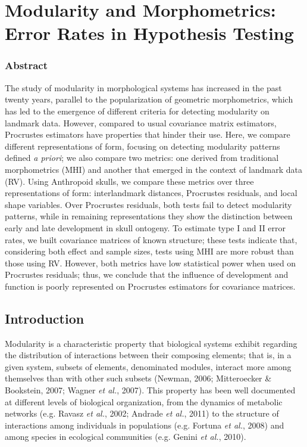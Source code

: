 \documentclass[12pt,twoside]{report}
\begin{document}


\def\sectionautorefname{Section} \def\chapterautorefname{Chapter}
\def\figureautorefname{Figure} \def\tableautorefname{Table}


\newpage
\chapter{Modularity and Morphometrics: Error Rates in Hypothesis Testing}
\label{ch:modcomp}

\subsection{Abstract}\label{abstract}

The study of modularity in morphological systems has increased in the
past twenty years, parallel to the popularization of geometric
morphometrics, which has led to the emergence of different criteria for
detecting modularity on landmark data. However, compared to usual
covariance matrix estimators, Procrustes estimators have properties that
hinder their use. Here, we compare different representations of form,
focusing on detecting modularity patterns defined \emph{a priori}; we
also compare two metrics: one derived from traditional morphometrics
(MHI) and another that emerged in the context of landmark data (RV).
Using Anthropoid skulls, we compare these metrics over three
representations of form: interlandmark distances, Procrustes residuals,
and local shape variables. Over Procrustes residuals, both tests fail to
detect modularity patterns, while in remaining representations they show
the distinction between early and late development in skull ontogeny. To
estimate type I and II error rates, we built covariance matrices of
known structure; these tests indicate that, considering both effect and
sample sizes, tests using MHI are more robust than those using RV.
However, both metrics have low statistical power when used on Procrustes
residuals; thus, we conclude that the influence of development and
function is poorly represented on Procrustes estimators for covariance
matrices.

\newpage

\section{Introduction}\label{introduction}

Modularity is a characteristic property that biological systems exhibit
regarding the distribution of interactions between their composing
elements; that is, in a given system, subsets of elements, denominated
modules, interact more among themselves than with other such subsets
(Newman, 2006; Mitteroecker \& Bookstein, 2007; Wagner \emph{et al.},
2007). This property has been well documented at different levels of
biological organization, from the dynamics of metabolic networks (e.g.
Ravasz \emph{et al.}, 2002; Andrade \emph{et al.}, 2011) to the
structure of interactions among individuals in populations (e.g. Fortuna
\emph{et al.}, 2008) and among species in ecological communities (e.g.
Genini \emph{et al.}, 2010).
\end{document}
